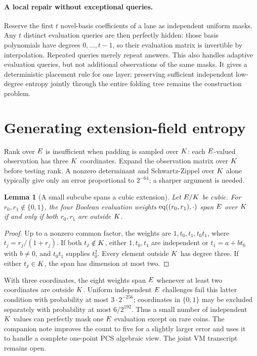 \documentclass[11pt]{article}
\newtheorem{lemma}[proposition]{Lemma}
\begin{document}
\paragraph{A local repair without exceptional queries.} Reserve the first $t$ novel-basis coefficients of a lane as independent uniform masks. Any $t$ distinct evaluation queries are then perfectly hidden: those basis polynomials have degrees $0,\ldots,t-1$, so their evaluation matrix is invertible by interpolation. Repeated queries merely repeat answers. This also handles adaptive evaluation queries, but not additional observations of the same masks. It gives a deterministic placement rule for one layer; preserving sufficient independent low-degree entropy jointly through the entire folding tree remains the construction problem.

\section{Generating extension-field entropy}

Rank over $E$ is insufficient when padding is sampled over $K$: each $E$-valued observation has three $K$ coordinates. Expand the observation matrix over $K$ before testing rank. A nonzero determinant and Schwartz-Zippel over $K$ alone typically give only an error proportional to $2^{-64}$; a sharper argument is needed.

\begin{lemma}[A small subcube spans a cubic extension]
Let $E/K$ be cubic. For $r_0,r_1\notin\{0,1\}$, the four Boolean evaluation weights $\operatorname{eq}((r_0,r_1),\cdot)$ span $E$ over $K$ if and only if both $r_0,r_1$ are outside $K$.
\end{lemma}

\begin{proof}
Up to a nonzero common factor, the weights are $1,t_0,t_1,t_0t_1$, where $t_j=r_j/(1+r_j)$. If both $t_j\notin K$, either $1,t_0,t_1$ are independent or $t_1=a+bt_0$ with $b\ne0$, and $t_0t_1$ supplies $t_0^2$. Every element outside $K$ has degree three. If either $t_j\in K$, the span has dimension at most two.
\end{proof}

With three coordinates, the eight weights span $E$ whenever at least two coordinates are outside $K$. Uniform independent $E$ challenges fail this latter condition with probability at most $3\cdot2^{-256}$; coordinates in $\{0,1\}$ may be excluded separately with probability at most $6/2^{192}$. Thus a small number of independent $K$ values can perfectly mask one $E$ evaluation except on rare coins. The companion note improves the count to five for a slightly larger error and uses it to handle a complete one-point PCS algebraic view. The joint VM transcript remains open.
\end{document}
